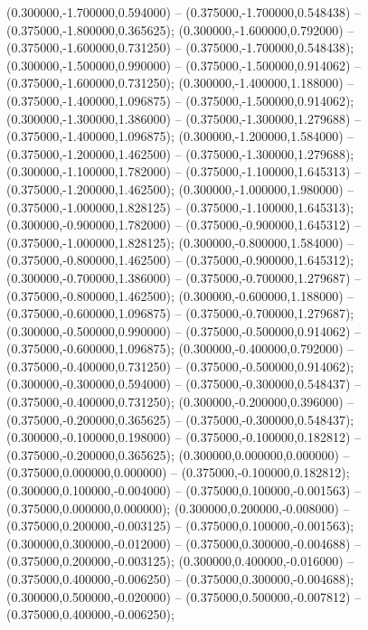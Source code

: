  (0.300000,-1.700000,0.594000) -- (0.375000,-1.700000,0.548438) -- (0.375000,-1.800000,0.365625);
 (0.300000,-1.600000,0.792000) -- (0.375000,-1.600000,0.731250) -- (0.375000,-1.700000,0.548438);
 (0.300000,-1.500000,0.990000) -- (0.375000,-1.500000,0.914062) -- (0.375000,-1.600000,0.731250);
 (0.300000,-1.400000,1.188000) -- (0.375000,-1.400000,1.096875) -- (0.375000,-1.500000,0.914062);
 (0.300000,-1.300000,1.386000) -- (0.375000,-1.300000,1.279688) -- (0.375000,-1.400000,1.096875);
 (0.300000,-1.200000,1.584000) -- (0.375000,-1.200000,1.462500) -- (0.375000,-1.300000,1.279688);
 (0.300000,-1.100000,1.782000) -- (0.375000,-1.100000,1.645313) -- (0.375000,-1.200000,1.462500);
 (0.300000,-1.000000,1.980000) -- (0.375000,-1.000000,1.828125) -- (0.375000,-1.100000,1.645313);
 (0.300000,-0.900000,1.782000) -- (0.375000,-0.900000,1.645312) -- (0.375000,-1.000000,1.828125);
 (0.300000,-0.800000,1.584000) -- (0.375000,-0.800000,1.462500) -- (0.375000,-0.900000,1.645312);
 (0.300000,-0.700000,1.386000) -- (0.375000,-0.700000,1.279687) -- (0.375000,-0.800000,1.462500);
 (0.300000,-0.600000,1.188000) -- (0.375000,-0.600000,1.096875) -- (0.375000,-0.700000,1.279687);
 (0.300000,-0.500000,0.990000) -- (0.375000,-0.500000,0.914062) -- (0.375000,-0.600000,1.096875);
 (0.300000,-0.400000,0.792000) -- (0.375000,-0.400000,0.731250) -- (0.375000,-0.500000,0.914062);
 (0.300000,-0.300000,0.594000) -- (0.375000,-0.300000,0.548437) -- (0.375000,-0.400000,0.731250);
 (0.300000,-0.200000,0.396000) -- (0.375000,-0.200000,0.365625) -- (0.375000,-0.300000,0.548437);
 (0.300000,-0.100000,0.198000) -- (0.375000,-0.100000,0.182812) -- (0.375000,-0.200000,0.365625);
 (0.300000,0.000000,0.000000) -- (0.375000,0.000000,0.000000) -- (0.375000,-0.100000,0.182812);
 (0.300000,0.100000,-0.004000) -- (0.375000,0.100000,-0.001563) -- (0.375000,0.000000,0.000000);
 (0.300000,0.200000,-0.008000) -- (0.375000,0.200000,-0.003125) -- (0.375000,0.100000,-0.001563);
 (0.300000,0.300000,-0.012000) -- (0.375000,0.300000,-0.004688) -- (0.375000,0.200000,-0.003125);
 (0.300000,0.400000,-0.016000) -- (0.375000,0.400000,-0.006250) -- (0.375000,0.300000,-0.004688);
 (0.300000,0.500000,-0.020000) -- (0.375000,0.500000,-0.007812) -- (0.375000,0.400000,-0.006250);

